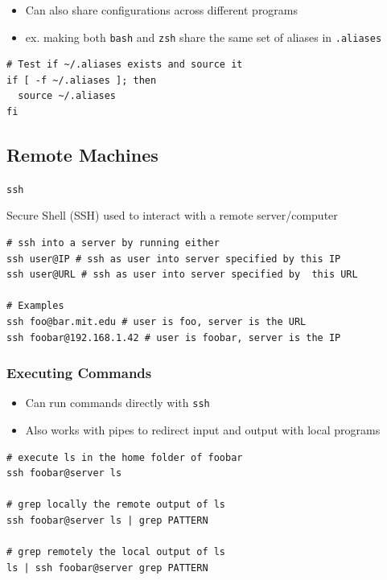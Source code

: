 \documentclass[letterpaper,12pt]{article}
\newcommand*{\lstitem}[1]{
  \setbox0\hbox{\lstinline{#1}}
  \item[\usebox0]
}
\begin{document}
\begin{itemize}
 \item Can also share configurations across different programs
 \item ex. making both \lstinline{bash} and \lstinline{zsh} share the same set of aliases in \lstinline{.aliases}
\end{itemize}

\begin{lstlisting}
# Test if ~/.aliases exists and source it
if [ -f ~/.aliases ]; then
  source ~/.aliases
fi
\end{lstlisting}

\subsection{Remote Machines}

\begin{description}
 \lstitem{ssh} Secure Shell (SSH) used to interact with a remote server/computer
\end{description}

\begin{lstlisting}
# ssh into a server by running either
ssh user@IP # ssh as user into server specified by this IP
ssh user@URL # ssh as user into server specified by  this URL

# Examples
ssh foo@bar.mit.edu # user is foo, server is the URL
ssh foobar@192.168.1.42 # user is foobar, server is the IP
\end{lstlisting}

\subsubsection{Executing Commands}
\begin{itemize}
 \item Can run commands directly with \lstinline{ssh}
 \item Also works with pipes to redirect input and output with local programs
\end{itemize}

\begin{lstlisting}
# execute ls in the home folder of foobar
ssh foobar@server ls

# grep locally the remote output of ls
ssh foobar@server ls | grep PATTERN

# grep remotely the local output of ls
ls | ssh foobar@server grep PATTERN
\end{lstlisting}
\end{document}
